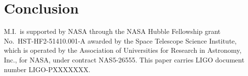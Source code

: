\documentclass[aps,prd,twocolumn,superscriptaddress,preprintnumbers,floatfix,nofootinbib]{revtex4-2}
\newcommand{\dcc}{LIGO-PXXXXXXX}
\begin{document}
\section{Conclusion}

\begin{acknowledgments}
M.I.\ is supported by NASA through the NASA Hubble Fellowship
grant No.\ HST-HF2-51410.001-A awarded by the Space Telescope
Science Institute, which is operated by the Association of Universities
for Research in Astronomy, Inc., for NASA, under contract NAS5-26555.
This paper carries LIGO document number \dcc{}.
\end{acknowledgments}


\end{document}
